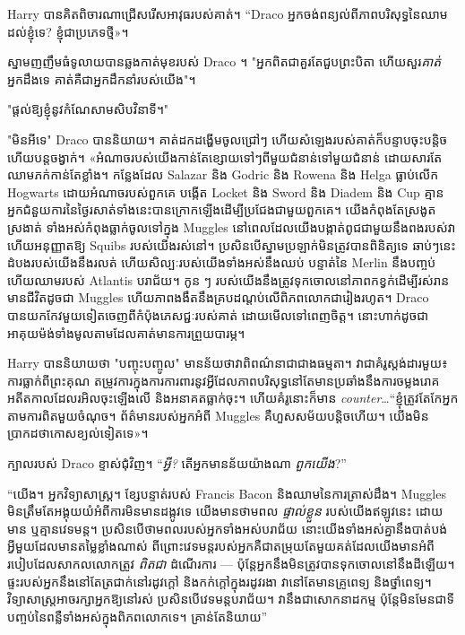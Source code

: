 Harry បានគិតពិចារណាជ្រើសរើសអាវុធរបស់គាត់។ “Draco អ្នកចង់ពន្យល់ពីភាពបរិសុទ្ធនៃឈាមដល់ខ្ញុំទេ? ខ្ញុំ​ជា​ប្រភេទ​ថ្មី»។

ស្នាមញញឹមធំទូលាយបានឆ្លងកាត់មុខរបស់ Draco ។ "អ្នកពិតជាគួរតែជួបព្រះបិតា ហើយសួរ\emph{គាត់} អ្នកដឹងទេ គាត់គឺជាអ្នកដឹកនាំរបស់យើង"។

"ផ្តល់ឱ្យខ្ញុំនូវកំណែសាមសិបវិនាទី។"

"មិនអីទេ" Draco បាននិយាយ។ គាត់ដកដង្ហើមចូលជ្រៅៗ ហើយសំឡេងរបស់គាត់ក៏បន្ទាបចុះបន្តិច ហើយបន្តចង្វាក់។ «អំណាច​របស់​យើង​កាន់​តែ​ខ្សោយ​ទៅៗ​ពី​មួយ​ជំនាន់​ទៅ​មួយ​ជំនាន់ ដោយ​សារ​តែ​ឈាម​ភក់​កាន់​តែ​ខ្លាំង។ កន្លែងដែល Salazar និង Godric និង Rowena និង Helga ធ្លាប់លើក Hogwarts ដោយអំណាចរបស់ពួកគេ បង្កើត Locket និង Sword និង Diadem និង Cup គ្មានអ្នកជំនួយការនៃថ្ងៃរសាត់ទាំងនេះបានក្រោកឡើងដើម្បីប្រជែងជាមួយពួកគេ។ យើងកំពុងតែស្រងូតស្រងាត់ ទាំងអស់កំពុងធ្លាក់ចូលទៅក្នុង Muggles នៅពេលដែលយើងបង្កាត់ពូជជាមួយនឹងពងរបស់វា ហើយអនុញ្ញាតឱ្យ Squibs របស់យើងរស់នៅ។ ប្រសិនបើស្នាមប្រឡាក់មិនត្រូវបានពិនិត្យទេ ឆាប់ៗនេះ ដំបងរបស់យើងនឹងរលត់ ហើយសិល្បៈរបស់យើងទាំងអស់នឹងឈប់ បន្ទាត់នៃ Merlin នឹងបញ្ចប់ ហើយឈាមរបស់ Atlantis បរាជ័យ។ កូន ៗ របស់យើងនឹងត្រូវទុកចោលនៅភាពកខ្វក់ដើម្បីរស់រានមានជីវិតដូចជា Muggles ហើយភាពងងឹតនឹងគ្របដណ្តប់លើពិភពលោកជារៀងរហូត។ Draco បានយកកែវមួយទៀតចេញពីកំប៉ុងភេសជ្ជៈរបស់គាត់ ដោយមើលទៅពេញចិត្ត។ នោះ​ហាក់​ដូច​ជា​អាគុយម៉ង់​ទាំង​មូល​តាម​ដែល​គាត់​មាន​ការ​ព្រួយ​បារម្ភ។

Harry បាននិយាយថា "បញ្ចុះបញ្ចូល" មានន័យថាវាពិពណ៌នាជាជាងធម្មតា។ វាជាគំរូស្ដង់ដារមួយ៖ ការធ្លាក់ពីព្រះគុណ តម្រូវការក្នុងការការពារនូវអ្វីដែលភាពបរិសុទ្ធនៅតែមានប្រឆាំងនឹងការចម្លងរោគ អតីតកាលដែលរអិលចុះឡើងលើ និងអនាគតធ្លាក់ចុះ។ ហើយគំរូនោះក៏មាន \emph{counter}…“ខ្ញុំត្រូវតែកែអ្នកតាមការពិតមួយចំណុច។ ព័ត៌មានរបស់អ្នកអំពី Muggles គឺហួសសម័យបន្តិចហើយ។ យើង​មិន​ប្រាកដ​ថា​កោស​ខ្យល់​ទៀត​ទេ»។

ក្បាលរបស់ Draco ខ្ទាស់ជុំវិញ។ “\emph{អ្វី?} តើអ្នកមានន័យយ៉ាងណា \emph{ពួកយើង}?”

“យើង។ អ្នកវិទ្យាសាស្ត្រ។ ខ្សែបន្ទាត់របស់ Francis Bacon និងឈាមនៃការត្រាស់ដឹង។ Muggles មិនត្រឹមតែអង្គុយយំអំពីការមិនមានដង្កូវទេ យើងមានថាមពល \emph{ ផ្ទាល់ខ្លួន} របស់យើងឥឡូវនេះ ដោយមាន ឬគ្មានវេទមន្ត។ ប្រសិនបើថាមពលរបស់អ្នកទាំងអស់បរាជ័យ នោះយើងទាំងអស់គ្នានឹងបាត់បង់អ្វីមួយដែលមានតម្លៃខ្លាំងណាស់ ពីព្រោះវេទមន្តរបស់អ្នកគឺជាតម្រុយតែមួយគត់ដែលយើងមានអំពីរបៀបដែលសាកលលោកត្រូវ \emph{ពិតជា} ដំណើរការ — ប៉ុន្តែអ្នកនឹងមិនត្រូវបានទុកចោលនៅនឹងដីឡើយ។ ផ្ទះរបស់អ្នកនឹងនៅតែត្រជាក់នៅរដូវក្តៅ និងកក់ក្តៅក្នុងរដូវរងា វានៅតែមានគ្រូពេទ្យ និងថ្នាំពេទ្យ។ វិទ្យាសាស្រ្តអាចរក្សាអ្នកឱ្យនៅរស់ ប្រសិនបើវេទមន្តបរាជ័យ។ វា​នឹង​ជា​សោកនាដកម្ម ប៉ុន្តែ​មិន​មែន​ជា​ទី​បញ្ចប់​នៃ​ពន្លឺ​ទាំងអស់​ក្នុង​ពិភពលោក​ទេ។ គ្រាន់តែនិយាយ”


